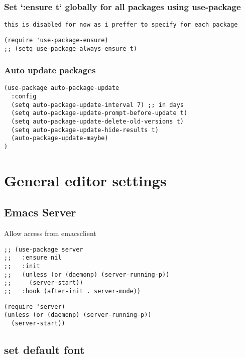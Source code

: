 \documentclass[11pt]{article}
\begin{document}
\subsubsection*{Set `:ensure t` globally for all packages using use-package}
\label{sec:org520f195}

\begin{verbatim}
this is disabled for now as i preffer to specify for each package
\end{verbatim}

\begin{verbatim}
(require 'use-package-ensure)
;; (setq use-package-always-ensure t)
\end{verbatim}

\subsubsection*{Auto update packages}
\label{sec:org4bb256c}
\begin{verbatim}
(use-package auto-package-update
  :config
  (setq auto-package-update-interval 7) ;; in days
  (setq auto-package-update-prompt-before-update t)
  (setq auto-package-update-delete-old-versions t)
  (setq auto-package-update-hide-results t)
  (auto-package-update-maybe)
)
\end{verbatim}


\section*{General editor settings}
\label{sec:org3a7c794}

\subsection*{Emacs Server}
\label{sec:org2ff0514}
Allow access from emacsclient
\begin{verbatim}
;; (use-package server
;;   :ensure nil
;;   :init
;;   (unless (or (daemonp) (server-running-p))
;;     (server-start))
;;   :hook (after-init . server-mode))
\end{verbatim}

\begin{verbatim}
(require 'server)
(unless (or (daemonp) (server-running-p))
  (server-start))
\end{verbatim}

\subsection*{set default font}
\label{sec:org8868ef5}
\end{document}
